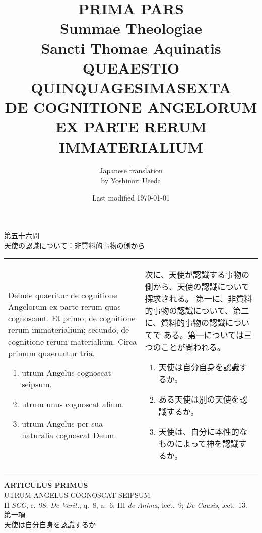 \documentclass[10pt]{jsarticle} %
\title{{\bf PRIMA PARS}\\{\HUGE Summae Theologiae}\\Sancti Thomae
Aquinatis\\{\sffamily QUEAESTIO QUINQUAGESIMASEXTA}\\DE COGNITIONE
ANGELORUM EX PARTE RERUM IMMATERIALIUM}
\author{Japanese translation\\by Yoshinori {\sc Ueeda}}
\date{Last modified \today}
\begin{document}
\maketitle
\pagestyle{fancy}

\begin{center}
{\Large 第五十六問\\天使の認識について：非質料的事物の側から}
\end{center}

\begin{longtable}{p{21em}p{21em}}
Deinde quaeritur de cognitione Angelorum ex parte rerum quas
 cognoscunt. Et primo, de cognitione rerum immaterialium; secundo, de
 cognitione rerum materialium. Circa primum quaeruntur tria.

\begin{enumerate}
 \item utrum Angelus cognoscat seipsum.
 \item utrum unus cognoscat alium.
 \item utrum Angelus per sua naturalia cognoscat Deum.
\end{enumerate}


 &

 次に、天使が認識する事物の側から、天使の認識について探求される。
 第一に、非質料的事物の認識について、第二に、質料的事物の認識についてで
 ある。第一については三つのことが問われる。

 \begin{enumerate}
  \item 天使は自分自身を認識するか。
  \item ある天使は別の天使を認識するか。
  \item 天使は、自分に本性的なものによって神を認識するか。
 \end{enumerate}

\end{longtable}
\newpage

\begin{center}
 {\Large {\bf ARTICULUS PRIMUS}}\\
 {\large UTRUM ANGELUS COGNOSCAT SEIPSUM}\\
 {\footnotesize II {\itshape SCG}, c.~98; {\itshape De Verit.}, q.~8,
 a.~6; III {\itshape de Anima}, lect.~9; {\itshape De Causis}, lect.~13.}\\
 {\Large 第一項\\天使は自分自身を認識するか}
\end{center}
\end{document}
